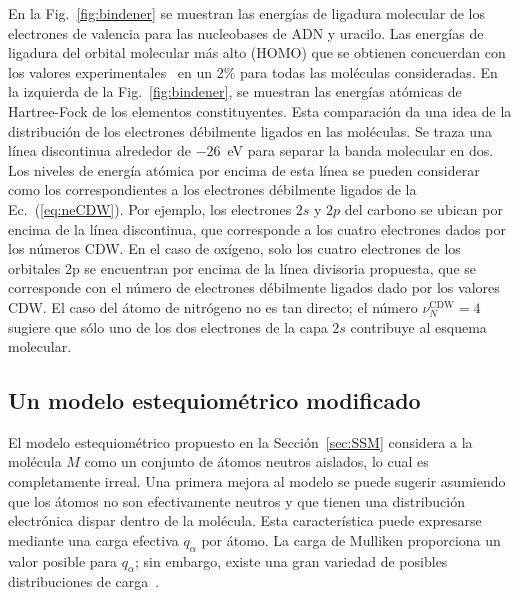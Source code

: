 En la Fig.~\ref{fig:bindener} se muestran las energías de ligadura 
molecular de los electrones de valencia para las nucleobases de ADN y 
uracilo. Las energías de ligadura del orbital molecular más alto (HOMO) 
que se obtienen concuerdan con los valores 
experimentales~\cite{Hush,Verkin,Dougherty} en un 2\% para todas las 
moléculas consideradas. En la izquierda de la Fig.~\ref{fig:bindener}, 
se muestran las energías atómicas de Hartree-Fock de los elementos 
constituyentes. Esta comparación da una idea de la distribución de los 
electrones débilmente ligados en las moléculas. Se traza una línea 
discontinua alrededor de $-26$~eV para separar la banda molecular en 
dos. Los niveles de energía atómica por encima de esta línea se pueden 
considerar como los correspondientes a los electrones débilmente ligados 
de la Ec.~(\ref{eq:neCDW}). Por ejemplo, los electrones $2s$ y $2p$ del 
carbono se ubican por encima de la línea discontinua, que corresponde a 
los cuatro electrones dados por los números CDW. En el caso de oxígeno, 
solo los cuatro electrones de los orbitales 2p se encuentran por encima 
de la línea divisoria propuesta, que se corresponde con el número de 
electrones débilmente ligados dado por los valores CDW. El caso del 
átomo de nitrógeno no es tan directo; el número $\nu_{N}^{\text{CDW}}=4$ 
sugiere que sólo uno de los dos electrones de la capa $2s$ contribuye al 
esquema molecular.

\subsection{Un modelo estequiométrico modificado}

El modelo estequiométrico propuesto en la Sección~\ref{sec:SSM} 
considera a la molécula $M$ como un conjunto de átomos neutros aislados, 
lo cual es completamente irreal. Una primera mejora al modelo se puede 
sugerir asumiendo que los átomos no son efectivamente neutros y que 
tienen una distribución electrónica dispar dentro de la molécula. Esta 
característica puede expresarse mediante una carga efectiva $q_{\alpha}$ 
por átomo. La carga de Mulliken proporciona un valor posible para 
$q_{\alpha}$; sin embargo, existe una gran variedad de posibles 
distribuciones de carga~\cite{lee2003}.

